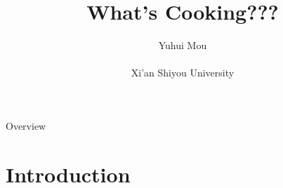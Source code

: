 \documentclass[
 size=14pt,
 paper=smartboard,  %
 mode=present, 		%
 display=slides, 	%
 style=tuliplab,  	%
 pauseslide,
 fleqn,leqno]{powerdot}
\title{What's Cooking???} %
\author{
Yuhui Mou
\\
\\Xi'an Shiyou University
} %
\newcommand\twotonebox[2]{\fcolorbox{pdcolor2}{pdcolor2}
{#1\vphantom{#2}}\fcolorbox{pdcolor2}{white}{#2\vphantom{#1}}}
\begin{document}
\maketitle



\begin{slide}[toc=,bm=]{Overview}  %
\tableofcontents
\end{slide}


\section{Introduction} %



\end{document}
